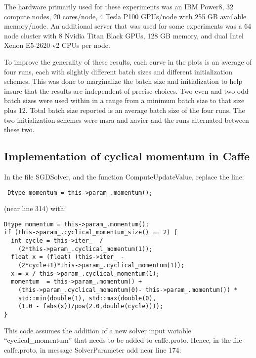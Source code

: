 \documentclass{article} %
\begin{document}
The hardware primarily used for these experiments was an IBM Power8, 32 compute nodes, 20 cores/node, 4 Tesla P100 GPUs/node with 255 GB available memory/node.  An additional server that was used for some experiments was a 64 node cluster with 8 Nvidia Titan Black GPUs, 128 GB memory, and dual Intel Xenon E5-2620 v2 CPUs per node.  

To improve the generality of these results, each curve in the plots is an average of four runs, each with slightly different batch sizes and different initialization schemes.  This was done to marginalize the batch size and initialization to help insure that the results are independent of precise choices.  Two even and two odd batch sizes were used within in a range from a minimum batch size to that size plus 12.  Total batch size reported is an average batch size of the four runs.  The two initialization schemes were msra and xavier and the runs alternated between these two.





\subsection{Implementation of cyclical momentum in Caffe}


In the file SGDSolver, and the function ComputeUpdateValue, replace the line:
 \begin{lstlisting}
 Dtype momentum = this->param_.momentum();
\end{lstlisting}
(near line 314) with:
\begin{lstlisting}
Dtype momentum = this->param_.momentum();
if (this->param_.cyclical_momentum_size() == 2) {
  int cycle = this->iter_  /
    (2*this->param_.cyclical_momentum(1));
  float x = (float) (this->iter_ - 
    (2*cycle+1)*this->param_.cyclical_momentum(1));
  x = x / this->param_.cyclical_momentum(1);
  momentum  = this->param_.momentum() + 
    (this->param_.cyclical_momentum(0)- this->param_.momentum()) *
    std::min(double(1), std::max(double(0), 
    (1.0 - fabs(x))/pow(2.0,double(cycle))));
}
\end{lstlisting}
This code assumes the addition of a new solver input variable ``cyclical\_momentum'' that needs to be added to caffe.proto.  Hence, in the file caffe.proto, in message SolverParameter add near line 174:
\end{document}

